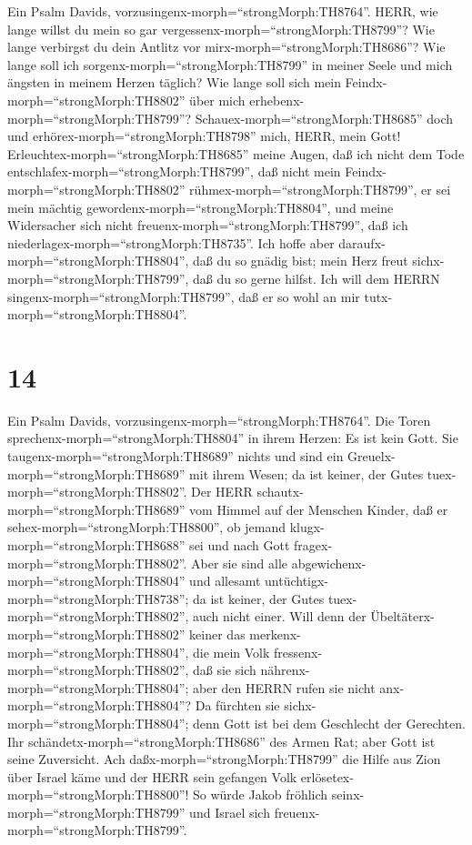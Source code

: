  Ein Psalm Davids,
vorzusingenx-morph=``strongMorph:TH8764''. HERR, wie lange willst du
mein so gar vergessenx-morph=``strongMorph:TH8799''? Wie lange verbirgst
du dein Antlitz vor mirx-morph=``strongMorph:TH8686''?  Wie
lange soll ich sorgenx-morph=``strongMorph:TH8799'' in meiner Seele und
mich ängsten in meinem Herzen täglich? Wie lange soll sich mein
Feindx-morph=``strongMorph:TH8802'' über mich
erhebenx-morph=``strongMorph:TH8799''? 
Schauex-morph=``strongMorph:TH8685'' doch und
erhörex-morph=``strongMorph:TH8798'' mich, HERR, mein Gott!
Erleuchtex-morph=``strongMorph:TH8685'' meine Augen, daß ich nicht dem
Tode entschlafex-morph=``strongMorph:TH8799'',  daß nicht
mein Feindx-morph=``strongMorph:TH8802''
rühmex-morph=``strongMorph:TH8799'', er sei mein mächtig
gewordenx-morph=``strongMorph:TH8804'', und meine Widersacher sich nicht
freuenx-morph=``strongMorph:TH8799'', daß ich
niederlagex-morph=``strongMorph:TH8735''.  Ich hoffe aber
daraufx-morph=``strongMorph:TH8804'', daß du so gnädig bist; mein Herz
freut sichx-morph=``strongMorph:TH8799'', daß du so gerne hilfst.
 Ich will dem HERRN singenx-morph=``strongMorph:TH8799'',
daß er so wohl an mir tutx-morph=``strongMorph:TH8804''.

\hypertarget{section-13}{%
\section{14}\label{section-13}}

 Ein Psalm Davids,
vorzusingenx-morph=``strongMorph:TH8764''. Die Toren
sprechenx-morph=``strongMorph:TH8804'' in ihrem Herzen: Es ist kein
Gott. Sie taugenx-morph=``strongMorph:TH8689'' nichts und sind ein
Greuelx-morph=``strongMorph:TH8689'' mit ihrem Wesen; da ist keiner, der
Gutes tuex-morph=``strongMorph:TH8802''.  Der HERR
schautx-morph=``strongMorph:TH8689'' vom Himmel auf der Menschen Kinder,
daß er sehex-morph=``strongMorph:TH8800'', ob jemand
klugx-morph=``strongMorph:TH8688'' sei und nach Gott
fragex-morph=``strongMorph:TH8802''.  Aber sie sind alle
abgewichenx-morph=``strongMorph:TH8804'' und allesamt
untüchtigx-morph=``strongMorph:TH8738''; da ist keiner, der Gutes
tuex-morph=``strongMorph:TH8802'', auch nicht einer.  Will
denn der Übeltäterx-morph=``strongMorph:TH8802'' keiner das
merkenx-morph=``strongMorph:TH8804'', die mein Volk
fressenx-morph=``strongMorph:TH8802'', daß sie sich
nährenx-morph=``strongMorph:TH8804''; aber den HERRN rufen sie nicht
anx-morph=``strongMorph:TH8804''?  Da fürchten sie
sichx-morph=``strongMorph:TH8804''; denn Gott ist bei dem Geschlecht der
Gerechten.  Ihr schändetx-morph=``strongMorph:TH8686'' des
Armen Rat; aber Gott ist seine Zuversicht.  Ach
daßx-morph=``strongMorph:TH8799'' die Hilfe aus Zion über Israel käme
und der HERR sein gefangen Volk erlösetex-morph=``strongMorph:TH8800''!
So würde Jakob fröhlich seinx-morph=``strongMorph:TH8799'' und Israel
sich freuenx-morph=``strongMorph:TH8799''.

